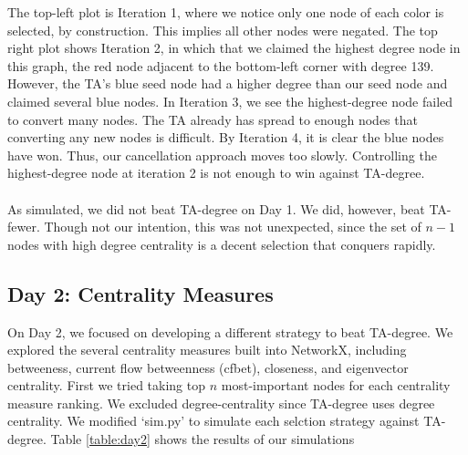 \documentclass[letterpaper, 11pt]{article}
\begin{document}
\noindent The top-left plot is Iteration 1, where we notice only one node of each color is selected, by construction. This implies all other nodes were negated. The top right plot shows Iteration 2, in which that we claimed the highest degree node in this graph, the red node adjacent to the bottom-left corner with degree 139. However, the TA's blue seed node had a higher degree than our seed node and claimed several blue nodes. In Iteration 3, we see the highest-degree node failed to convert many nodes. The TA already has spread to enough nodes that converting any new nodes is difficult. By Iteration 4, it is clear the blue nodes have won. Thus, our cancellation approach moves too slowly. Controlling the highest-degree node at iteration 2 is not enough to win against TA-degree.
\\\\
As simulated, we did not beat TA-degree on Day 1. We did, however, beat TA-fewer. Though not our intention, this was not unexpected, since the set of $n-1$ nodes with high degree centrality is a decent selection that conquers rapidly.

\subsection{Day 2: Centrality Measures}
On Day 2, we focused on developing a different strategy to beat TA-degree. We explored the several centrality measures built into NetworkX, including betweeness, current flow betweenness (cfbet), closeness, and eigenvector centrality. First we tried taking top $n$ most-important nodes for each centrality measure ranking. We excluded degree-centrality since TA-degree uses degree centrality. We modified `sim.py' to simulate each selction strategy against TA-degree. Table \ref{table:day2} shows the results of our simulations
\end{document}
